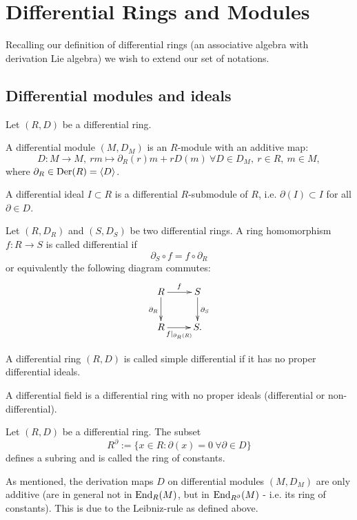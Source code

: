 \section{Differential Rings and Modules}
Recalling our definition of differential rings (an associative algebra with derivation Lie algebra) we wish to extend our set of notations.
\subsection{Differential modules and ideals}
\begin{defi}
Let $(R,D)$ be a differential ring.
\bn
\item A differential module $(M,D_M)$ is an $R$-module with an additive map:
$$D : M \longrightarrow M,\ r m \longmapsto \partial_R(r) m + r D(m)\ \forall D \in D_M,\ r \in R,\ m \in M,$$
where $\partial_R \in \mathrm{Der}(R) = \left<D\right>$.
\item A differential ideal $I \subset R$ is a differential $R$-submodule of $R$, i.e. $\partial(I) \subset I$ for all $\partial \in D$.
\item Let $(R,D_R)$ and $(S,D_S)$ be two differential rings. A ring homomorphism $f : R \longrightarrow S$ is called differential if
$$\partial_S \circ f = f \circ \partial_R$$
or equivalently the following diagram commutes:
$$\xymatrix{
R \ar[d]_{\partial_R} \ar[r]^f & S\ar[d]^{\partial_S}\\
R \ar[r]_{f\mid_{\partial_R(R)}} & S.\\
}$$
\item A differential ring $(R,D)$ is called simple differential if it has no proper differential ideals.
\item A differential field is a differential ring with no proper ideals (differential or non-differential).
\item Let $(R,D)$ be a differential ring. The subset
$$R^\partial := \{x \in R : \partial(x) = 0\ \forall \partial \in D\}$$
defines a subring and is called the ring of constants.
\en
{}
\end{defi}
\bmk As mentioned, the derivation maps $D$ on differential modules $(M,D_M)$ are only additive (are in general not in $\mathrm{End}_R(M)$, but in $\mathrm{End}_{R^\partial}(M)$ - i.e. its ring of constants). This is due to the Leibniz-rule as defined above.\\
